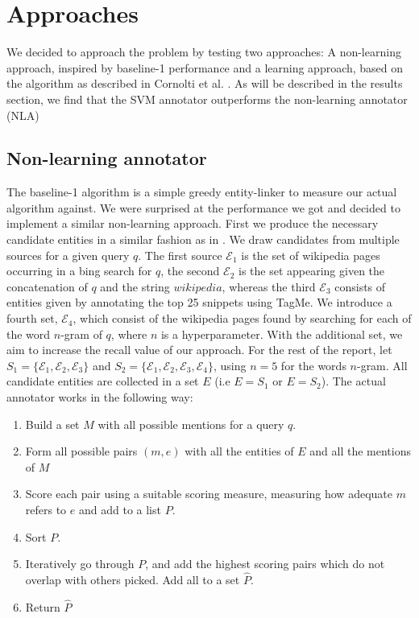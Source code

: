 \documentclass{article}
\begin{document}
\section{Approaches}
We decided to approach the problem by testing two approaches: A non-learning approach, inspired by baseline-1 performance and a learning approach, based on the algorithm as described in Cornolti et al. \cite{cornolti16}. As will be described in the results section, we find that the SVM annotator outperforms the non-learning annotator (NLA)

\subsection{Non-learning annotator}
The baseline-1 algorithm is a simple greedy entity-linker to measure our actual algorithm against. We were surprised at the performance we got and decided to implement a similar non-learning approach. First we produce the necessary candidate entities in a similar fashion as in \cite{cornolti16}. We draw candidates from multiple sources for a given query $q$. The first source $\mathcal{E}_1$ is the set of wikipedia pages occurring in a bing search for $q$, the second $\mathcal{E}_2$ is the set appearing given the concatenation of $q$ and the string $wikipedia$, whereas the third $\mathcal{E}_3$ consists of entities given by annotating the top 25 snippets using TagMe\cite{tagme}. We introduce a fourth set, $\mathcal{E}_4$, which consist of the wikipedia pages found by searching for each of the word $n$-gram of $q$, where $n$ is a hyperparameter. With the additional set, we aim to increase the recall value of our approach. For the rest of the report, let $S_1 = \{\mathcal{E}_1, \mathcal{E}_2, \mathcal{E}_3\}$ and $S_2 =  \{\mathcal{E}_1, \mathcal{E}_2, \mathcal{E}_3, \mathcal{E}_4\}$, using $n=5$ for the words $n$-gram. All candidate entities are collected in a set $E$ (i.e $E = S_1$ or $E = S_2$). The actual annotator works in the following way:

\begin{enumerate}
\itemsep0em
\item Build a set $M$ with all possible mentions for a query $q$.
\item Form all possible pairs $(m,e)$ with all the entities of $E$ and all the mentions of $M$
\item Score each pair using a suitable scoring measure, measuring how adequate $m$ refers to $e$ and add to a list $P$.
\item Sort $P$.
\item Iteratively go through $P$, and add the highest scoring pairs which do not overlap with others picked. Add all to a set $\hat P$.
\item Return $\hat P$
\end{enumerate}
\end{document}
